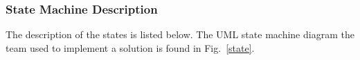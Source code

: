 \begin{figure}[h!]
\centering
\cprotect {}
\end{figure}



\subsubsection{State Machine Description}
The description of the states is listed below. The UML state machine
diagram the team used to implement a solution is found in
Fig.~\ref{state}.

